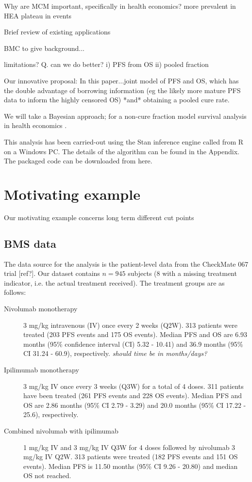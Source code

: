 \documentclass[AMA,STIX1COL]{WileyNJD-v2}
\begin{document}
Why are MCM important, specifically in health economics?
more prevalent in HEA
plateau in events

Brief review of existing applications


BMC to give background...

limitations?
Q. can we do better?
i) PFS from OS
ii) pooled fraction

Our innovative proposal:
In this paper...joint model of PFS and OS, which has the double advantage of borrowing information
(eg the likely more mature PFS data to inform the highly censored OS)
*and* obtaining a pooled cure rate.

We will take a Bayesian approach; for a non-cure fraction model survival analysis in health economics \cite{Demiris2006,Jackson2010}.

This analysis has been carried-out using the Stan inference engine
\cite{carpenter2017stan} called from R on a Windows PC.
The details of the algorithm can be found in the Appendix.
The packaged code can be downloaded from here.


\section{Motivating example}\label{sec:example}
Our motivating example concerns
long term
different cut points

\subsection{BMS data}
The data source for the analysis is the patient-level data from the CheckMate 067 trial [ref?].
Our dataset contains $n = 945$ subjects (8 with a missing treatment indicator, i.e. the actual treatment received). The treatment groups are as  follows:
\begin{description}
\item[Nivolumab monotherapy] 3 mg/kg intravenous (IV) once every 2 weeks (Q2W). 313 patients were treated (203 PFS events and 175 OS events). Median PFS and OS are 6.93 months (95\% confidence interval (CI) 5.32 - 10.41) and 36.9 months (95\% CI 31.24 - 60.9), respectively. {\it should time be in months/days?}
\item[Ipilimumab monotherapy] 3 mg/kg IV once every 3 weeks (Q3W) for a total of 4 doses. 311 patients have been treated (261 PFS events and 228 OS events). Median PFS and OS are 2.86 months (95\% CI 2.79 - 3.29) and 20.0 months (95\% CI 17.22 - 25.6), respectively.
\item[Combined nivolumab with ipilimumab] 1 mg/kg IV and 3 mg/kg IV Q3W for 4 doses followed by nivolumab 3 mg/kg IV Q2W. 313 patients were treated (182 PFS events and 151 OS events). Median PFS is 11.50 months (95\% CI 9.26 - 20.80) and median OS not reached. 
\end{description}
\end{document}
